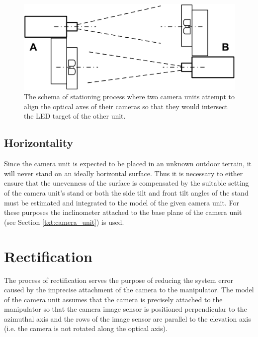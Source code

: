 \begin{figure}[htb]
	\centering
	\includegraphics[width=14cm]{fig/stationing_aiming.png}
	\caption{The schema of stationing process where two camera units attempt to align the optical axes of their cameras so that they would intersect the LED target of the other unit.}
	\label{fig:stationing_aiming}
\end{figure}


\subsection{Horizontality}
Since the camera unit is expected to be placed in an unknown outdoor terrain, it will never stand on an ideally horizontal surface. Thus it is necessary to either ensure that the unevenness of the surface is compensated by the suitable setting of the camera unit's stand or both the side tilt and front tilt angles of the stand must be estimated and integrated to the model of the given camera unit. For these purposes the inclinometer attached to the base plane of the camera unit (see Section \ref{txt:camera_unit}) is used.


\section{Rectification}

The process of rectification serves the purpose of reducing the system error caused by the imprecise attachment of the camera to the manipulator. The model of the camera unit assumes that the camera is precisely attached to the manipulator so that the camera image sensor is positioned perpendicular to the azimuthal axis and the rows of the image sensor are parallel to the elevation axis (i.e. the camera is not rotated along the optical axis).

